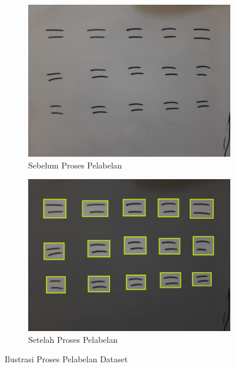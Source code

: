 \begin{figure}[H]
    \begin{subfigure}{.5\textwidth}
      \centering
      \captionsetup{width=.8\linewidth}
      \includegraphics[width=.85\linewidth]{gambar/label_before.jpg}
      \caption{Sebelum Proses Pelabelan}
      \label{fig:labelbefore}
    \end{subfigure}%
    \begin{subfigure}{.5\textwidth}
      \centering
      \captionsetup{width=.8\linewidth}
      \includegraphics[width=.85\linewidth]{gambar/label_after.png}
      \caption{Setelah Proses Pelabelan}
      \label{fig:labelafter}
    \end{subfigure}
    \caption{Ilustrasi Proses Pelabelan Dataset}
    \label{fig:ilustrasipelabelan}
  \end{figure}

